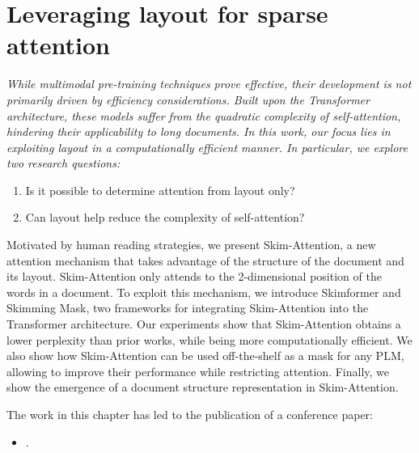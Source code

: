 
\chapter{Leveraging layout for sparse attention}
\label{chapter:skim-attention}

\renewcommand{\leftmark}{\spacedlowsmallcaps{Leveraging layout for sparse attention}}

\begin{chapabstract}
	{\em    
        While multimodal pre-training techniques prove effective, their development is not primarily driven by efficiency considerations. Built upon the Transformer architecture, these models suffer from the quadratic complexity of self-attention, hindering their applicability to long documents. In this work, our focus lies in exploiting layout in a computationally efficient manner. In particular, we explore two research questions: 
        \begin{enumerate}
            \item Is it possible to determine attention from layout only? 
            \item Can layout help reduce the complexity of self-attention? 
        \end{enumerate}
        Motivated by human reading strategies, we present Skim-Attention, a new attention mechanism that takes advantage of the structure of the document and its layout. Skim-Attention only attends to the 2-dimensional position of the words in a document. To exploit this mechanism, we introduce Skimformer and Skimming Mask, two frameworks for integrating Skim-Attention into the Transformer architecture. Our experiments show that Skim-Attention obtains a lower perplexity than prior works, while being more computationally efficient. We also show how Skim-Attention can be used off-the-shelf as a mask for any \ac{PLM}, allowing to improve their performance while restricting attention. Finally, we show the emergence of a document structure representation in Skim-Attention.     
	\vspace*{5mm}
	
	The work in this chapter has led to the publication of a conference paper:}
	\begin{itemize}
		\item \small {}.
	\end{itemize}
\end{chapabstract}



